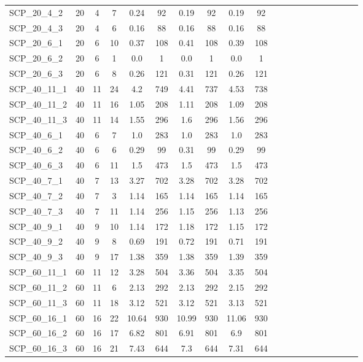 \begin{sidewaystable}[!ht]
{\begin{tabular}{lccccccccccccccccccc}
SCP\_20\_4\_2 & 20 & 4 & 7 & 0.24 & 92 & 0.19 & 92 & 0.19 & 92 \\
SCP\_20\_4\_3 & 20 & 4 & 6 &  \textcolor{blue2}{0.16} & 88 &  \textcolor{blue2}{0.16} & 88 &  \textcolor{blue2}{0.16} & 88 \\
SCP\_20\_6\_1 & 20 & 6 & 10 & 0.37 & 108 & 0.41 & 108 & 0.39 & 108 \\
SCP\_20\_6\_2 & 20 & 6 & 1 &  \textcolor{blue2}{0.0} & 1 &  \textcolor{blue2}{0.0} & 1 &  \textcolor{blue2}{0.0} & 1 \\
SCP\_20\_6\_3 & 20 & 6 & 8 & 0.26 & 121 & 0.31 & 121 & 0.26 & 121 \\
SCP\_40\_11\_1 & 40 & 11 & 24 & 4.2 & 749 & 4.41 & 737 & 4.53 & 738 \\
SCP\_40\_11\_2 & 40 & 11 & 16 & 1.05 & 208 & 1.11 & 208 & 1.09 & 208 \\
SCP\_40\_11\_3 & 40 & 11 & 14 & 1.55 & 296 & 1.6 & 296 & 1.56 & 296 \\
SCP\_40\_6\_1 & 40 & 6 & 7 & 1.0 & 283 & 1.0 & 283 & 1.0 & 283 \\
SCP\_40\_6\_2 & 40 & 6 & 6 & 0.29 & 99 & 0.31 & 99 & 0.29 & 99 \\
SCP\_40\_6\_3 & 40 & 6 & 11 & 1.5 & 473 & 1.5 & 473 & 1.5 & 473 \\
SCP\_40\_7\_1 & 40 & 7 & 13 & 3.27 & 702 & 3.28 & 702 & 3.28 & 702 \\
SCP\_40\_7\_2 & 40 & 7 & 3 & 1.14 & 165 & 1.14 & 165 & 1.14 & 165 \\
SCP\_40\_7\_3 & 40 & 7 & 11 & 1.14 & 256 & 1.15 & 256 & 1.13 & 256 \\
SCP\_40\_9\_1 & 40 & 9 & 10 & 1.14 & 172 & 1.18 & 172 & 1.15 & 172 \\
SCP\_40\_9\_2 & 40 & 9 & 8 & 0.69 & 191 & 0.72 & 191 & 0.71 & 191 \\
SCP\_40\_9\_3 & 40 & 9 & 17 &  \textcolor{blue2}{1.38} & 359 &  \textcolor{blue2}{1.38} & 359 & 1.39 & 359 \\
SCP\_60\_11\_1 & 60 & 11 & 12 & 3.28 & 504 & 3.36 & 504 & 3.35 & 504 \\
SCP\_60\_11\_2 & 60 & 11 & 6 & 2.13 & 292 & 2.13 & 292 & 2.15 & 292 \\
SCP\_60\_11\_3 & 60 & 11 & 18 & 3.12 & 521 & 3.12 & 521 & 3.13 & 521 \\
SCP\_60\_16\_1 & 60 & 16 & 22 & 10.64 & 930 & 10.99 & 930 & 11.06 & 930 \\
SCP\_60\_16\_2 & 60 & 16 & 17 & 6.82 & 801 & 6.91 & 801 & 6.9 & 801 \\
SCP\_60\_16\_3 & 60 & 16 & 21 & 7.43 & 644 & 7.3 & 644 & 7.31 & 644 \\

\end{tabular}}
\end{sidewaystable}
